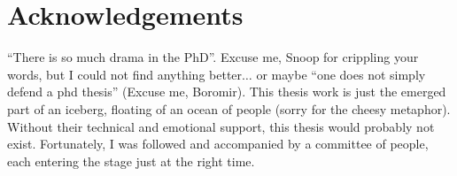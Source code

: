 \chapter*{Acknowledgements}

``There is so much drama in the PhD''.
Excuse me, Snoop for crippling your words, but I could not find anything better$\ldots$ or maybe ``one does not simply defend a phd thesis'' (Excuse me, Boromir).
This thesis work is just the emerged part of an iceberg, floating of an ocean of people (sorry for the cheesy metaphor).
Without their technical and emotional support, this thesis would probably not exist.
Fortunately, I was followed and accompanied by a committee of people, each entering the stage just at the right time.

